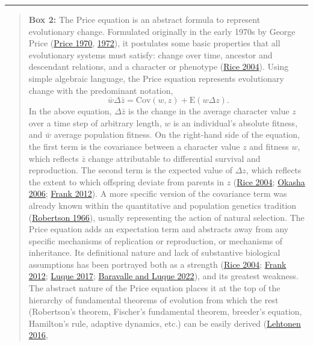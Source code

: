 \documentclass[
]{article}
\begin{document}
\begin{center}\rule{0.5\linewidth}{0.5pt}\end{center}

\begin{quote}
\textbf{Box 2:} The Price equation is an abstract formula to represent
evolutionary change. Formulated originally in the early 1970s by George
Price (\protect\hyperlink{ref-Price1970}{Price 1970},
\protect\hyperlink{ref-Price1972}{1972}), it postulates some basic
properties that all evolutionary systems must satisfy: change over time,
ancestor and descendant relations, and a character or phenotype
(\protect\hyperlink{ref-Rice2004}{Rice 2004}). Using simple algebraic
language, the Price equation represents evolutionary change with the
predominant notation,
\[\bar{w}\Delta\bar{z} = \mathrm{Cov}\left(w, z\right) + \mathrm{E}\left(w\Delta z\right).\]
In the above equation, \(\Delta\bar{z}\) is the change in the average
character value \(z\) over a time step of arbitrary length, \(w\) is an
individual's absolute fitness, and \(\bar{w}\) average population
fitness. On the right-hand side of the equation, the first term is the
covariance between a character value \(z\) and fitness \(w\), which
reflects \(\bar{z}\) change attributable to differential survival and
reproduction. The second term is the expected value of \(\Delta z\),
which reflects the extent to which offspring deviate from parents in
\(z\) (\protect\hyperlink{ref-Rice2004}{Rice 2004};
\protect\hyperlink{ref-Okasha2006}{Okasha 2006};
\protect\hyperlink{ref-Frank2012}{Frank 2012}). A more specific version
of the covariance term was already known within the quantitative and
population genetics tradition
(\protect\hyperlink{ref-Robertson1966}{Robertson 1966}), usually
representing the action of natural selection. The Price equation adds an
expectation term and abstracts away from any specific mechanisms of
replication or reproduction, or mechanisms of inheritance. Its
definitional nature and lack of substantive biological assumptions has
been portrayed both as a strength (\protect\hyperlink{ref-Rice2004}{Rice
2004}; \protect\hyperlink{ref-Frank2012}{Frank 2012};
\protect\hyperlink{ref-Luque2016}{Luque 2017};
\protect\hyperlink{ref-Baravalle2022}{Baravalle and Luque 2022}), and
its greatest weakness. The abstract nature of the Price equation places
it at the top of the hierarchy of fundamental theorems of evolution from
which the rest (Robertson's theorem, Fischer's fundamental theorem,
breeder's equation, Hamilton's rule, adaptive dynamics, etc.) can be
easily derived (\protect\hyperlink{ref-Lehtonen2016}{Lehtonen 2016},

\end{quote}
\end{document}
